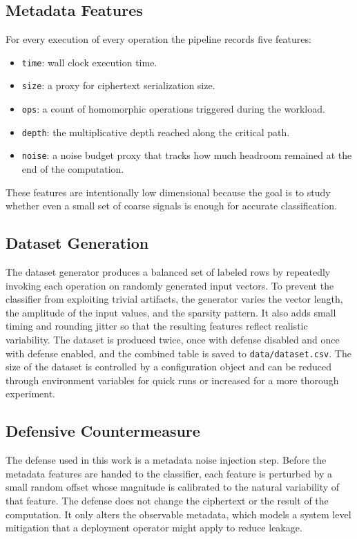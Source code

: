 \documentclass[12pt,a4paper]{article}
\begin{document}
\subsection{Metadata Features}
For every execution of every operation the pipeline records five features:
\begin{itemize}[leftmargin=*]
  \item \texttt{time}: wall clock execution time.
  \item \texttt{size}: a proxy for ciphertext serialization size.
  \item \texttt{ops}: a count of homomorphic operations triggered during the workload.
  \item \texttt{depth}: the multiplicative depth reached along the critical path.
  \item \texttt{noise}: a noise budget proxy that tracks how much headroom remained at the end of the computation.
\end{itemize}
These features are intentionally low dimensional because the goal is to study whether even a small set of coarse signals is enough for accurate classification.

\subsection{Dataset Generation}
The dataset generator produces a balanced set of labeled rows by repeatedly invoking each operation on randomly generated input vectors. To prevent the classifier from exploiting trivial artifacts, the generator varies the vector length, the amplitude of the input values, and the sparsity pattern. It also adds small timing and rounding jitter so that the resulting features reflect realistic variability. The dataset is produced twice, once with defense disabled and once with defense enabled, and the combined table is saved to \texttt{data/dataset.csv}. The size of the dataset is controlled by a configuration object and can be reduced through environment variables for quick runs or increased for a more thorough experiment.

\subsection{Defensive Countermeasure}
The defense used in this work is a metadata noise injection step. Before the metadata features are handed to the classifier, each feature is perturbed by a small random offset whose magnitude is calibrated to the natural variability of that feature. The defense does not change the ciphertext or the result of the computation. It only alters the observable metadata, which models a system level mitigation that a deployment operator might apply to reduce leakage.
\end{document}
